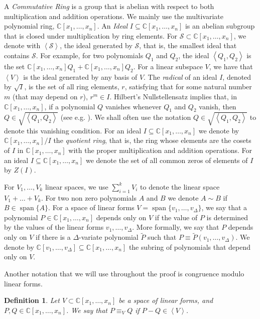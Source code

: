 \documentclass[10pt,a4paper]{article}
\newtheorem{definition}[theorem]{Definition}
\renewcommand{\C}{\mathbb{C}}
\newcommand{\calS}{{\mathcal{S}}}
\newcommand{\ideal}[1]{\left \langle{#1}\right \rangle}
\newcommand{\MVar}[2]{{#1}_1,\ldots, {#1}_{#2}}
\newcommand{\PRing}[3]{\mathbb{#1}[ \MVar{#2}{#3}]}
\newcommand{\CRing}[2]{\PRing{C}{#1}{#2}}
\newcommand{\spn}[1]{\operatorname{span}\{{#1}\}}
\begin{document}
A \emph{Commutative Ring} is a group that is abelian with respect to both multiplication and addition operations. We mainly use the multivariate polynomial ring, $\CRing{x}{n}$. An \emph{Ideal} $I\subseteq \CRing{x}{n}$ is an abelian subgroup that is closed under multiplication by ring elements. For $\calS \subset \CRing{x}{n}$, we  denote with $\ideal{\calS}$, the ideal generated by $\calS$, that is, the smallest ideal that contains $\calS$. For example, for two polynomials $Q_1$ and $Q_2$, the ideal $\ideal{Q_1,Q_2}$ is the set $\CRing{x}{n}Q_1 + \CRing{x}{n}Q_2$. For a linear subspace $V$, we have that $\ideal{V}$ is the ideal generated by any basis of $V$. The \emph{radical} of an ideal $I$, denoted by $\sqrt{I}$, is the set of all ring elements, $r$, satisfying that for some natural number $m$ (that may depend on $r$), $r^m \in I$. Hilbert's Nullstellensatz  implies that, in $\C[x_1,\ldots,x_n]$, if a polynomial $Q$ vanishes whenever $Q_1$ and $Q_2$ vanish, then $Q\in \sqrt{\ideal{Q_1,Q_2}}$ (see e.g. \cite{CLO}). We shall often use the notation $Q\in \sqrt{\ideal{Q_1,Q_2}}$ to denote this vanishing condition. For an ideal $I\subseteq \CRing{x}{n}$ we denote by $\CRing{x}{n} /I$ the \emph{quotient ring}, that is, the ring whose elements are the cosets of $I$ in $\CRing{x}{n}$ with the proper multiplication and addition operations. For an ideal $I\subseteq \CRing{x}{n}$ we denote the set of all common zeros of elements of $I$ by $Z(I)$.


For $V_1,\ldots,V_k$ linear spaces, we use $\sum_{i=1}^k V_i$ to denote the linear space $V_1 + \ldots + V_k$. For two non zero polynomials $A$ and $B$ we denote $A\sim B$ if $B \in \spn{A}$. For a space of linear forms $V = \spn{\MVar{v}{\Delta}}$, we say that a polynomial $P \in \CRing{x}{n}$ depends only on $V$  if the value of $P$ is determined by the values of the linear forms $v_1,\ldots,v_\Delta$. More formally, we say that $P$ depends only on $V$ if there is a $\Delta$-variate polynomial $\tilde{P}$ such that $P \equiv \tilde{P}(v_1,\ldots,v_\Delta)$. We denote by  $\CRing{v}{\Delta}\subseteq \CRing{x}{n}$ the subring of polynomials that depend only on $V$.


Another notation that we will use throughout the proof is congruence modulo linear forms.
\begin{definition}\label{def:mod-form}
Let $V\subset \CRing{x}{n}$ be a space of linear forms, and $P,Q\in \CRing{x}{n}$. We say that $P\equiv_V Q$ if $P-Q \in \ideal{V}$. 
\end{definition}
\end{document}
